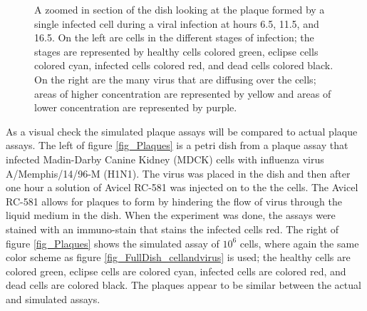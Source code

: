\begin{figure}
\begin{minipage}{0.66\linewidth}
    \vspace{0.25em}
\end{minipage}
\caption{A zoomed in section of the dish looking at the plaque formed by a single infected cell during a viral infection at hours 6.5, 11.5, and 16.5. On the left are cells in the different stages of infection; the stages are represented by healthy cells colored green, eclipse cells colored cyan, infected cells colored red, and dead cells colored black. On the right are the many virus that are diffusing over the cells; areas of higher concentration are represented by yellow and areas of lower concentration are represented by purple. \label{fig_ZoominDish}}
\end{figure}

As a visual check the simulated plaque assays will be compared to actual plaque assays. The left of figure \ref{fig_Plaques} is a petri dish from a plaque assay that infected Madin-Darby Canine Kidney (MDCK) cells with influenza virus A/Memphis/14/96-M (H1N1). The virus was placed in the dish and then after one hour a solution of Avicel RC-581 was injected on to the the cells. The Avicel RC-581 allows for plaques to form by hindering the flow of virus through the liquid medium in the dish. When the experiment was done, the assays were stained with an immuno-stain that stains the infected cells red. The right of figure \ref{fig_Plaques} shows the simulated assay of $10^{6}$ cells, where again the same color scheme as figure \ref{fig_FullDish_cellandvirus} is used; the healthy cells are colored
green, eclipse cells are colored cyan, infected cells are colored red, and dead cells are colored black. The plaques appear to be similar between the actual and simulated assays.

